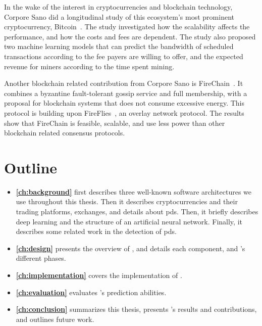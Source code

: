 In the wake of the interest in cryptocurrencies and blockchain technology, Corpore Sano did a longitudinal study of this ecosystem's most prominent cryptocurrency, Bitcoin~\cite{tedeschi2017trading}. The study investigated how the scalability affects the performance, and how the costs and fees are dependent. The study also proposed two machine learning models that can predict the bandwidth of scheduled transactions according to the fee payers are willing to offer, and the expected revenue for miners according to the time spent mining.

Another blockchain related contribution from Corpore Sano is FireChain~\cite{mikalsen2018firechain}. It combines a byzantine fault-tolerant gossip service and full membership, with a proposal for blockchain systems that does not consume excessive energy. This protocol is building upon FireFlies~\cite{johansen2015fireflies}, an overlay network protocol. The results show that FireChain is feasible, scalable, and use less power than other blockchain related consensus protocols.

\section{Outline}\label{sec:outline}
\begin{itemize}
    \item[] \textbf{\autoref{ch:background}} first describes three well-known software architectures we use throughout this thesis. Then it describes cryptocurrencies and their trading platforms, exchanges, and details about \acp{pd}. Then, it briefly describes deep learning and the structure of an artificial neural network. Finally, it describes some related work in the detection of \acp{pd}. 
    
    \item[] \textbf{\autoref{ch:design}} presents the overview of \project, and details each component, and \project's different phases.
    
    \item[] \textbf{\autoref{ch:implementation}} covers the implementation of \project.
    
    \item[] \textbf{\autoref{ch:evaluation}} evaluates \project's prediction abilities. 
    
    \item[] \textbf{\autoref{ch:conclusion}} summarizes this thesis, presents \project's results and contributions, and outlines future work.
 \end{itemize}